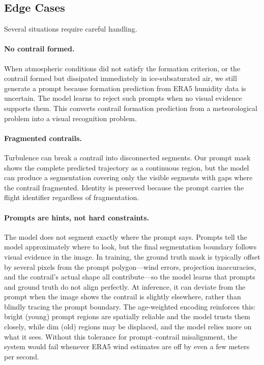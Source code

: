 \documentclass[review]{elsarticle}
\begin{document}
\subsection{Edge Cases}

Several situations require careful handling.

\paragraph{No contrail formed.} When atmospheric conditions did not satisfy the formation criterion, or the contrail formed but dissipated immediately in ice-subsaturated air, we still generate a prompt because formation prediction from ERA5 humidity data is uncertain. The model learns to reject such prompts when no visual evidence supports them. This converts contrail formation prediction from a meteorological problem into a visual recognition problem.

\paragraph{Fragmented contrails.} Turbulence can break a contrail into disconnected segments. Our prompt mask shows the complete predicted trajectory as a continuous region, but the model can produce a segmentation covering only the visible segments with gaps where the contrail fragmented. Identity is preserved because the prompt carries the flight identifier regardless of fragmentation.

\paragraph{Prompts are hints, not hard constraints.} The model does not segment exactly where the prompt says. Prompts tell the model approximately where to look, but the final segmentation boundary follows visual evidence in the image. In training, the ground truth mask is typically offset by several pixels from the prompt polygon---wind errors, projection inaccuracies, and the contrail's actual shape all contribute---so the model learns that prompts and ground truth do not align perfectly. At inference, it can deviate from the prompt when the image shows the contrail is slightly elsewhere, rather than blindly tracing the prompt boundary. The age-weighted encoding reinforces this: bright (young) prompt regions are spatially reliable and the model trusts them closely, while dim (old) regions may be displaced, and the model relies more on what it sees. Without this tolerance for prompt--contrail misalignment, the system would fail whenever ERA5 wind estimates are off by even a few meters per second.
\end{document}
